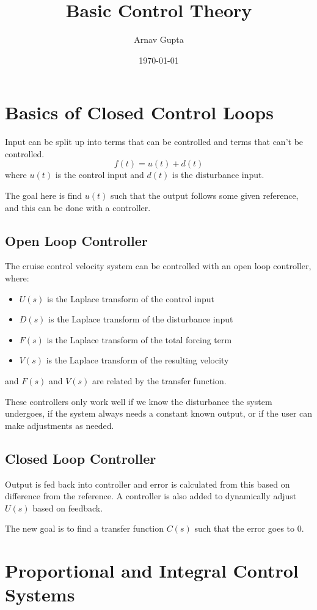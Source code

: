 \documentclass[11pt]{article}
\author{Arnav Gupta}
\date{\today}
\title{Basic Control Theory}
\begin{document}
\maketitle
\tableofcontents

\section{Basics of Closed Control Loops}
\label{sec:org1e6d12c}
Input can be split up into terms that can be controlled and terms that can't be controlled.
$$
f(t) = u(t) + d(t)
$$
where \(u(t)\) is the control input and \(d(t)\) is the disturbance input.

The goal here is find \(u(t)\) such that the output follows some given reference, and this
can be done with a controller.
\subsection{Open Loop Controller}
\label{sec:org26c82c4}
The cruise control velocity system can be controlled with an open loop controller,
where:
\begin{itemize}
\item \(U(s)\) is the Laplace transform of the control input
\item \(D(s)\) is the Laplace transform of the disturbance input
\item \(F(s)\) is the Laplace transform of the total forcing term
\item \(V(s)\) is the Laplace transform of the resulting velocity
\end{itemize}
and \(F(s)\) and \(V(s)\) are related by the transfer function.

These controllers only work well if we know the disturbance the system undergoes, if the
system always needs a constant known output, or if the user can make adjustments as
needed.
\subsection{Closed Loop Controller}
\label{sec:org11a4224}
Output is fed back into controller and error is calculated from this based on difference
from the reference.
A controller is also added to dynamically adjust \(U(s)\) based on feedback.

The new goal is to find a transfer function \(C(s)\) such that the error goes to 0.
\section{Proportional and Integral Control Systems}
\label{sec:orgab38086}
\end{document}
